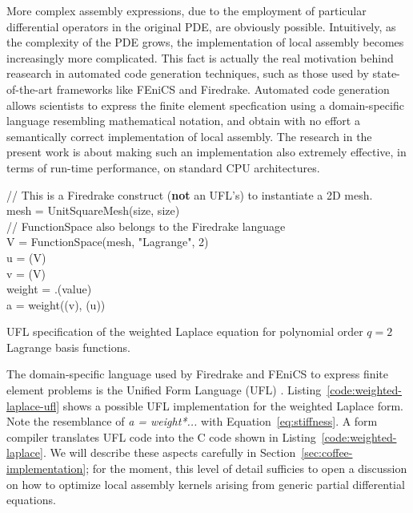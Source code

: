 More complex assembly expressions, due to the employment of particular differential operators in the original PDE, are obviously possible. Intuitively, as the complexity of the PDE grows, the implementation of local assembly becomes increasingly more complicated. This fact is actually the real motivation behind reasearch in automated code generation techniques, such as those used by state-of-the-art frameworks like FEniCS and Firedrake. Automated code generation allows scientists to express the finite element specfication using a domain-specific language resembling mathematical notation, and obtain with no effort a semantically correct implementation of local assembly. The research in the present work is about making such an implementation also extremely effective, in terms of run-time performance, on standard CPU architectures. 

\begin{algorithm}
\scriptsize
{}

// This is a Firedrake construct (\textbf{not} an UFL's) to instantiate a 2D mesh.\\
mesh = UnitSquareMesh(size, size)\\
// FunctionSpace also belongs to the Firedrake language \\
V = FunctionSpace(mesh, "Lagrange", 2)\\
u = (V)\\
v = (V)\\
weight = .(value)\\
a = weight\KwSty{*}((v), (u))
\caption{UFL specification of the weighted Laplace equation for polynomial order $q=2$ Lagrange basis functions.}
\label{code:weighted-laplace-ufl}
\end{algorithm}

The domain-specific language used by Firedrake and FEniCS to express finite element problems is the Unified Form Language (UFL) \citep{ufl}. Listing~\ref{code:weighted-laplace-ufl} shows a possible UFL implementation for the weighted Laplace form. Note the resemblance of \emph{a = weight*...} with Equation~\ref{eq:stiffness}. A form compiler translates UFL code into the C code shown in Listing~\ref{code:weighted-laplace}. We will describe these aspects carefully in Section~\ref{sec:coffee-implementation}; for the moment, this level of detail sufficies to open a discussion on how to optimize local assembly kernels arising from generic partial differential equations.

